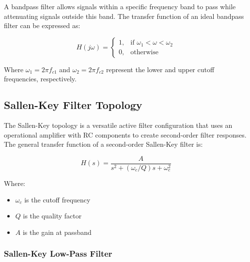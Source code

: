 \documentclass{article}
\begin{document}
A bandpass filter allows signals within a specific frequency band to pass while attenuating signals outside this band. The transfer function of an ideal bandpass filter can be expressed as:

\[
H(j\omega) = 
\begin{cases}
1, & \text{if } \omega_1 < \omega < \omega_2 \\
0, & \text{otherwise}
\end{cases}
\]

Where $\omega_1 = 2\pi f_{c1}$ and $\omega_2 = 2\pi f_{c2}$ represent the lower and upper cutoff frequencies, respectively.

\subsection*{Sallen-Key Filter Topology}

The Sallen-Key topology is a versatile active filter configuration that uses an operational amplifier with RC components to create second-order filter responses. The general transfer function of a second-order Sallen-Key filter is:

\[
H(s) = \frac{A}{s^2 + (\omega_c/Q)s + \omega_c^2}
\]

Where:
\begin{itemize}
\item $\omega_c$ is the cutoff frequency
\item $Q$ is the quality factor
\item $A$ is the gain at passband
\end{itemize}

\subsubsection*{Sallen-Key Low-Pass Filter}
\end{document}
